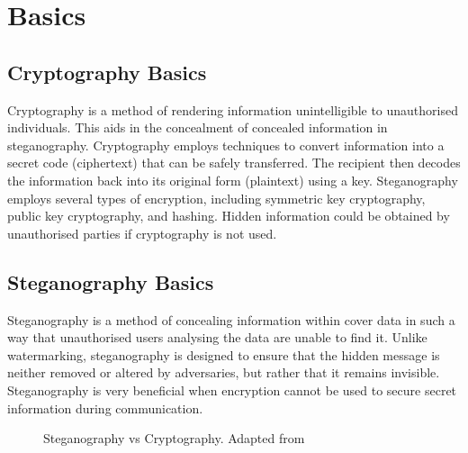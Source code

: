 \chapter{Basics}
\section{Cryptography Basics}
Cryptography is a method of rendering information unintelligible to unauthorised individuals. This aids in the concealment of concealed information in steganography. Cryptography employs techniques to convert information into a secret code (ciphertext) that can be safely transferred. The recipient then decodes the information back into its original form (plaintext) using a key. Steganography employs several types of encryption, including symmetric key cryptography, public key cryptography, and hashing. Hidden information could be obtained by unauthorised parties if cryptography is not used.
\section{Steganography Basics}
Steganography is a method of concealing information within cover data in such a way that unauthorised users analysing the data are unable to find it. Unlike watermarking, steganography is designed to ensure that the hidden message is neither removed or altered by adversaries, but rather that it remains invisible. Steganography is very beneficial when encryption cannot be used to secure secret information during communication.

\begin{figure}[ht!]
\centering
{}
\caption{Steganography vs Cryptography. Adapted from \cite{article2}}
\end{figure}

